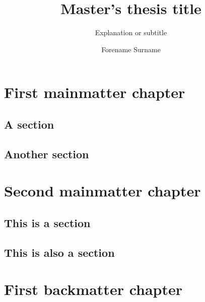 \documentclass[noprint,nocopyright]{uit-thesis-test}
\begin{document}
\title{Master's thesis title}
\subtitle{Explanation or subtitle}
\author{Forename Surname}

\maketitle

\frontmatter

\begin{acknowledgement}
\lipsum[1-5]
\end{acknowledgement}

\tableofcontents

\mainmatter

\chapter{First mainmatter chapter}

\lipsum[1]

\section{A section}
\lipsum[3-8]

\section{Another section}
\lipsum[9]

\chapter{Second mainmatter chapter}

\lipsum[1]

\section{This is a section}
\lipsum[3-8]

\section{This is also a section}
\lipsum[9]

\backmatter

\chapter{First backmatter chapter}
\end{document}
